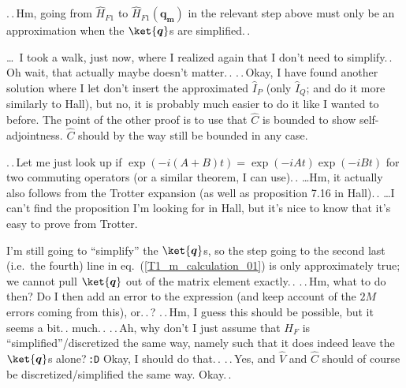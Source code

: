 \documentclass{report}
\begin{document}
.\,.\,Hm, going from $\hat H_{F1}$ to $\hat H_{F1}(\boldsymbol{q_m})$ in the relevant step above must only be an approximation when the $\ket{\boldsymbol{q}}$s are simplified.\,. %

\ldots\ I took a walk, just now, where I realized again that I don't need to simplify.\,. Oh wait, that actually maybe doesn't matter.\,. .\,.\,Okay, I have found another solution where I let don't insert the approximated $\hat I_P$ (only $\hat I_Q$; and do it more similarly to Hall), but no, it is probably much easier to do it like I wanted to before. The point of the other proof is to use that $\hat C$ is bounded to show self-adjointness. $\hat C$ should by the way still be bounded in any case. 

.\,.\,Let me just look up if $\exp(-i (A + B) t) = \exp(-i A t) \exp(-i B t)$ for two commuting operators (or a similar theorem, I can use).\,. \ldots Hm, it actually also follows from the Trotter expansion (as well as proposition 7.16 in Hall).\,. \ldots I can't find the proposition I'm looking for in Hall, but it's nice to know that it's easy to prove from Trotter. 

I'm still going to ``simplify'' the $\ket{\boldsymbol{q}}$s, so the step going to the second last (i.e.\ the fourth) line in eq.\ (\ref{T1_m_calculation_01}) is only approximately true; we cannot pull $\ket{\boldsymbol{q}}$ out of the matrix element exactly.\,. .\,.\,Hm, what to do then? Do I then add an error to the expression (and keep account of the $2M$ errors coming from this), or.\,.\,? .\,.\,Hm, I guess this should be possible, but it seems a bit.\,. much.\,. .\,.\,Ah, why don't I just assume that $H_F$ is ``simplified''/discretized the same way, namely such that it does indeed leave the $\ket{\boldsymbol{q}}$s alone?\,\texttt{:D} Okay, I should do that.\,. .\,.\,Yes, and $\hat V$ and $\hat C$ should of course be discretized/simplified the same way. Okay.\,. 
\end{document}
